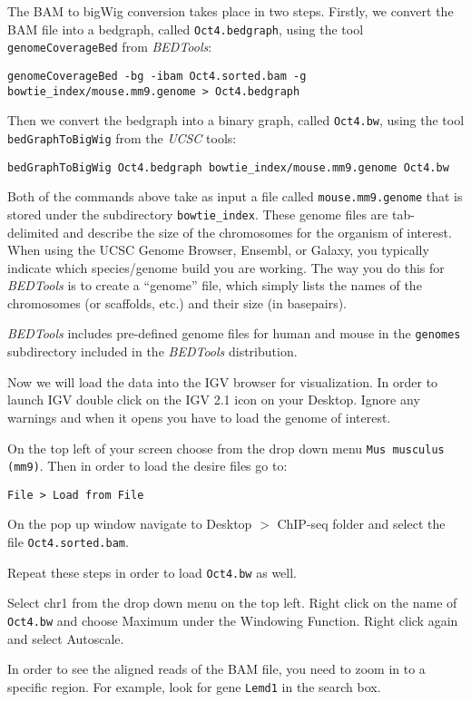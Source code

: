 \begin{steps}
The BAM to bigWig conversion takes place in two steps. Firstly, we convert the
BAM file into a bedgraph, called \texttt{Oct4.bedgraph}, using the tool
\texttt{genomeCoverageBed} from \emph{BEDTools}:

\begin{lstlisting}
genomeCoverageBed -bg -ibam Oct4.sorted.bam -g bowtie_index/mouse.mm9.genome > Oct4.bedgraph
\end{lstlisting}

Then we convert the bedgraph into a binary graph, called \texttt{Oct4.bw}, using the
tool \texttt{bedGraphToBigWig} from the \emph{UCSC} tools:

\begin{lstlisting}
bedGraphToBigWig Oct4.bedgraph bowtie_index/mouse.mm9.genome Oct4.bw
\end{lstlisting}
\end{steps}

\begin{note}
Both of the commands above take as input a file called \texttt{mouse.mm9.genome} that
is stored under the subdirectory \texttt{bowtie\_index}. These genome files are
tab-delimited and describe the size of the chromosomes for the organism of
interest. When using the UCSC Genome Browser, Ensembl, or Galaxy, you typically
indicate which species/genome build you are working. The way you do this for
\emph{BEDTools} is to create a ``genome'' file, which simply lists the names of
the chromosomes (or scaffolds, etc.) and their size (in basepairs).

\emph{BEDTools} includes pre-defined genome files for human and mouse in the
\texttt{genomes} subdirectory included in the \emph{BEDTools} distribution.
\end{note}

\begin{steps}
Now we will load the data into the IGV browser for visualization. In order to
launch IGV double click on the IGV 2.1 icon on your Desktop. Ignore any warnings
and when it opens you have to load the genome of interest.

On the top left of your screen choose from the drop down menu \texttt{Mus musculus
(mm9)}. Then in order to load the desire files go to:

\begin{lstlisting}
File > Load from File
\end{lstlisting}

On the pop up window navigate to Desktop $>$ ChIP-seq folder and select the file
\texttt{Oct4.sorted.bam}.

Repeat these steps in order to load \texttt{Oct4.bw} as well.

Select chr1 from the drop down menu on the top left. Right click on the name of
\texttt{Oct4.bw} and choose Maximum under the Windowing Function. Right click again and
select Autoscale.

In order to see the aligned reads of the BAM file, you need to zoom in to a
specific region. For example, look for gene \texttt{Lemd1} in the search box.
\end{steps}

